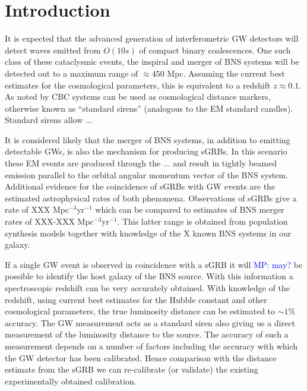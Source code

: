 \documentclass[10pt]{iopart}
\newcommand{\MP}[1]{\textcolor{blue}{MP: #1}}
\begin{document}
\section{Introduction\label{sec:intro}}

It is expected that the advanced generation of interferometric \ac{GW}
detectors will detect waves emitted from $O(10s)$ of compact binary
coalescences.  One such class of these cataclysmic events, the inspiral and
merger of \ac{BNS} systems will be detected out to a maximum range of $\approx
450$ Mpc. Assuming the current best estimates for the cosmological parameters,
this is equivalent to a redshift $z\approx 0.1$. As noted by \cite{1986Natur.323..310S} \ac{CBC}
systems can be used as cosmological distance markers, otherwise known as
``standard sirens'' (analogous to the \ac{EM} standard candles). Standard sirens
allow ...

It is considered likely that the merger of \ac{BNS} systems, in addition to
emitting detectable \acp{GW}, is also the mechanism for producing \acp{sGRB}.
In this scenario these \ac{EM} events are produced through the ... and result
in tightly beamed emission parallel to the orbital angular momentum vector of
the \ac{BNS} system. Additional evidence for the coincidence of \acp{sGRB} with
\ac{GW} events are the estimated astrophysical rates of both phenomena.
Observations of \acp{sGRB} give a rate of XXX Mpc$^{-3}$yr$^{-1}$ which can be
compared to estimates of \ac{BNS} merger rates of XXX-XXX Mpc$^{-3}$yr$^{-1}$.
This latter range is obtained from population synthesis models together with
knowledge of the X known \ac{BNS} systems in our galaxy. 
  
If a single \ac{GW} event is observed in coincidence with a \ac{sGRB} it will \MP{may?}
be possible to identify the host galaxy of the \ac{BNS} source.  With this
information a spectroscopic redshift can be very accurately obtained. With
knowledge of the redshift, using current best estimates for the Hubble constant
and other cosmological parameters, the true luminosity distance can be
estimated to $\sim 1\%$ accuracy.  The \ac{GW} measurement acts as a standard
siren also giving us a direct measurement of the luminosity distance to the source.
The accuracy of such a measurement depends on a number of factors including the
accuracy with which the \ac{GW} detector has been calibrated.  Hence comparison
with the distance estimate from the \ac{sGRB} we can re-calibrate (or validate)
the existing experimentally obtained calibration. 
\end{document}
